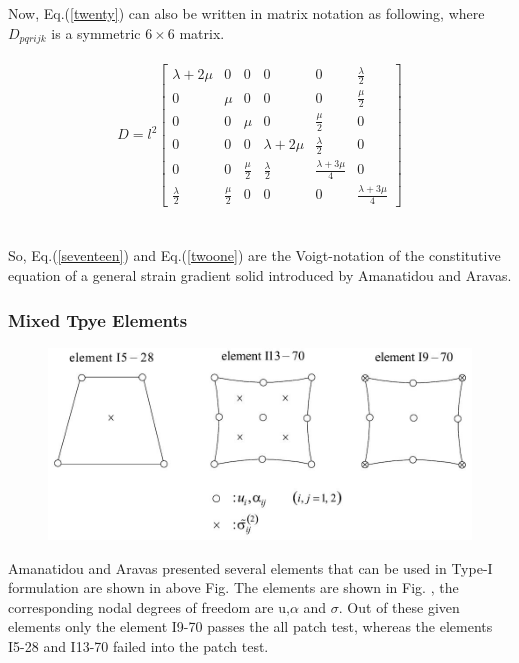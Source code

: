 \documentclass[12pt]{article}
\begin{document}
\\
\\
Now, Eq.(\ref{twenty}) can also be written in matrix notation as following, where $D_{pqrijk}$ is a symmetric $6\times6$ matrix.
\\
\\
\begin{equation}\label{twoone}
D = l^2
\begin{bmatrix}
\lambda + 2\mu & 0 & 0 & 0 & 0 & \frac{\lambda}{2} \\
0 & \mu & 0  & 0  & 0  & \frac{\mu}{2} \\
0 & 0 & \mu & 0  & \frac{\mu}{2}  & 0 \\
0 & 0 & 0 & \lambda + 2\mu & \frac{\lambda}{2} & 0 \\
0 & 0 & \frac{\mu}{2}  & \frac{\lambda}{2} & \frac{\lambda + 3\mu}{4} & 0 \\
 \frac{\lambda}{2} & \frac{\mu}{2} & 0 & 0 & 0 & \frac{\lambda + 3\mu}{4} 
\end{bmatrix}
\end{equation}
\\
\\
So, Eq.(\ref{seventeen}) and Eq.(\ref{twoone}) are the Voigt-notation of the constitutive equation of a general strain gradient solid introduced by Amanatidou and Aravas. 

\newpage
\subsubsection{ Mixed Tpye Elements}
    \begin{figure}[H]
    	\begin{center}
		     \includegraphics[scale=.65]{Element_mixed_type_formulation_E_Amanatidou.JPG}  	
	    \end{center}     
    \end{figure}
Amanatidou and Aravas presented several elements that can be used in Type-I formulation are shown in above Fig. The elements are shown in Fig. , the corresponding nodal degrees of freedom are u,$\alpha$ and $\sigma$. Out of these given elements only the element I9-70 passes the all patch test, whereas the elements I5-28 and I13-70 failed into the patch test.
\\
\\
\end{document}
